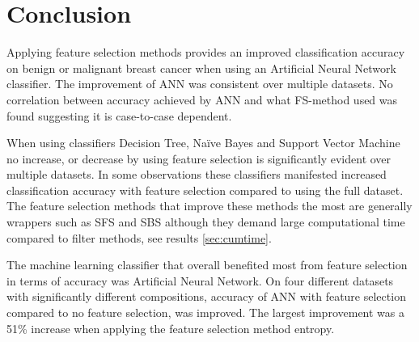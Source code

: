 \chapter{Conclusion}




Applying feature selection methods provides an improved classification accuracy on benign or malignant breast cancer when using an Artificial Neural Network classifier. The improvement of ANN was consistent over multiple datasets. No correlation between accuracy achieved by ANN and what FS-method used was found suggesting it is case-to-case dependent.

When using classifiers Decision Tree, Na\"ive Bayes and Support Vector Machine no increase, or decrease by using feature selection is significantly evident over multiple datasets. In some observations these classifiers manifested increased classification accuracy with feature selection compared to using the full dataset. The feature selection methods that improve these methods the most are generally wrappers such as SFS and SBS although they demand large computational time compared to filter methods, see results \ref{sec:cumtime}.


The machine learning classifier that overall benefited most from feature selection in terms of accuracy was Artificial Neural Network. On four different datasets with significantly different compositions, accuracy of ANN with feature selection compared to no feature selection, was improved. The largest improvement was a 51\% increase when applying the feature selection method entropy.

